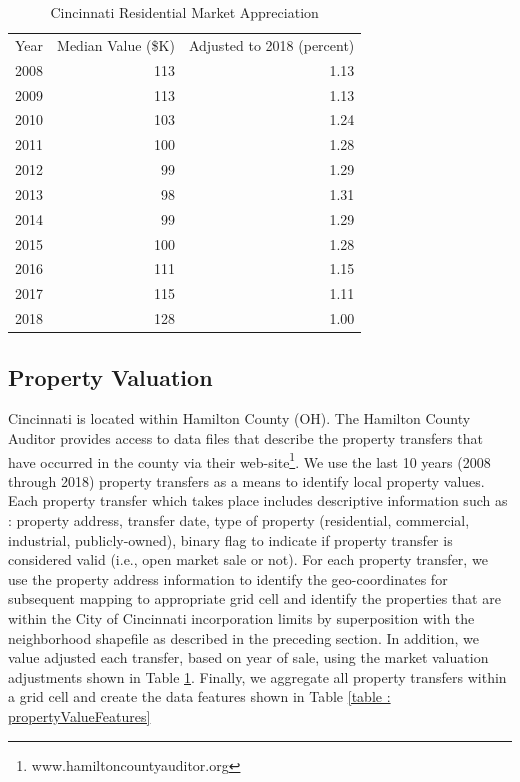 \documentclass{llncs}
\begin{document}
\FloatBarrier
\begin{table}[!h]
\begin{center}
\caption{Cincinnati Residential Market Appreciation}
\label{table : marketappreciation}
\begin{tabular}{lrr}
\hline
\rule{0pt}{12pt}
Year	&	Median Value (\$K)	&	Adjusted to 2018 (percent)	\\
2008	&	113	&	1.13	\\
2009	&	113	&	1.13	\\
2010	&	103	&	1.24	\\
2011	&	100	&	1.28	\\
2012	&	99	&	1.29	\\
2013	&	98	&	1.31	\\
2014	&	99	&	1.29	\\
2015	&	100	&	1.28	\\
2016	&	111	&	1.15	\\
2017	&	115	&	1.11	\\
2018	&	128	&	1.00	\\[2pt]
\hline
\end{tabular}
\end{center}
\end{table}
\FloatBarrier
%


\subsection{Property Valuation}

Cincinnati is located within Hamilton County (OH). The Hamilton County Auditor provides access to data files that describe the property transfers that have occurred in the county via their web-site\footnote{\label{hcauditor}www.hamiltoncountyauditor.org}. We use the last 10 years (2008 through 2018) property transfers as a means to identify local property values. Each property transfer which takes place includes descriptive information such as : property address, transfer date, type of property (residential, commercial, industrial, publicly-owned), binary flag to indicate if property transfer is considered valid (i.e., open market sale or not). For each property transfer, we use the property address information to identify the geo-coordinates for subsequent mapping to appropriate grid cell and identify the properties that are within the City of Cincinnati incorporation limits by superposition with the neighborhood shapefile as described in the preceding section. In addition, we value adjusted each transfer, based on year of sale, using the market valuation adjustments shown in Table  \ref{table : marketappreciation}. Finally, we aggregate all property transfers within a grid cell and create the data features shown in Table \ref{table : propertyValueFeatures} 
\end{document}
